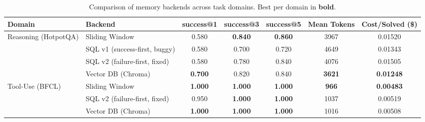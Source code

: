 \begin{table}[h]
\centering
\caption{Comparison of memory backends across task domains. Best per domain in \textbf{bold}.}
\label{tab:memory_comparison}
\begin{tabular}{llccccc}
\hline
Domain & Backend & success@1 & success@3 & success@5 & Mean Tokens & Cost/Solved (\$) \\
\hline
Reasoning (HotpotQA) & Sliding Window & 0.580 & \textbf{0.840} & \textbf{0.860} & 3967 & 0.01520 \\
 & SQL v1 (success-first, buggy) & 0.580 & 0.700 & 0.720 & 4649 & 0.01343 \\
 & SQL v2 (failure-first, fixed) & 0.580 & 0.780 & 0.840 & 4076 & 0.01505 \\
 & Vector DB (Chroma) & \textbf{0.700} & 0.820 & 0.840 & \textbf{3621} & \textbf{0.01248} \\
\hline
Tool-Use (BFCL) & Sliding Window & \textbf{1.000} & \textbf{1.000} & \textbf{1.000} & \textbf{966} & \textbf{0.00483} \\
 & SQL v2 (failure-first, fixed) & 0.950 & \textbf{1.000} & \textbf{1.000} & 1037 & 0.00519 \\
 & Vector DB (Chroma) & \textbf{1.000} & \textbf{1.000} & \textbf{1.000} & 1016 & 0.00508 \\
\hline
\end{tabular}
\end{table}